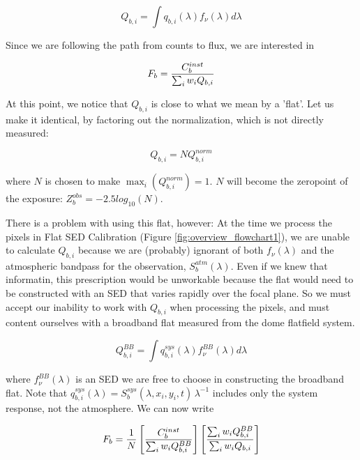 \documentclass[12pt,preprint]{aastex}
\begin{document}
\begin{equation}
Q_{b,i} = \int {q_{b,i}(\lambda) f_\nu(\lambda) d\lambda}
\end{equation}

Since we are following the path from counts to flux, we are interested in

\begin{equation}
F_b = {C_b^{inst} \over {\sum_i{w_i Q_{b,i}}}}
\label{eqn:trueFlat}
\end{equation}

At this point, we notice that $Q_{b,i}$ is close to what we mean by a 'flat'.  Let us make it identical, by factoring out 
the normalization, which is not directly measured:

\begin{equation}
Q_{b,i} = N Q_{b,i}^{norm}
\end{equation}

where $N$ is chosen to make $\max_i(Q_{b,i}^{norm}) = 1$.  $N$ will become the zeropoint of the exposure:
$Z_b^{obs} = -2.5 log_{10}(N)$.

There is a problem with using this flat, however:  At the time we process the pixels
in Flat SED Calibration (Figure \ref{fig:overview_flowchart1}), we are unable to calculate $Q_{b,i}$ because we are (probably) ignorant
of both $f_\nu(\lambda)$ and the atmospheric bandpass for the observation, $S_b^{atm}(\lambda)$.  Even if we knew that informatin, 
this prescription would be unworkable because the flat would need to be constructed with an SED 
that varies rapidly over the focal plane.   So we must accept our inability to work with $Q_{b,i}$ when processing the pixels, and must
content ourselves with a broadband flat measured from the dome flatfield system.

\begin{equation}
Q_{b,i}^{BB} = \int {q_{b,i}^{sys}(\lambda) f_\nu^{BB}(\lambda) d\lambda}
\end{equation}

where $f_\nu^{BB}(\lambda)$ is an SED we are free to choose in constructing the broadband flat. Note that 
$q_{b,i}^{sys}(\lambda)=S_b^{sys}(\lambda,x_i,y_i,t) \, \lambda^{-1}$ 
includes only the system response, not the atmosphere.  We can now write

\begin{equation}
F_b = {1 \over N} \left[ {C_b^{inst} \over {\sum_i{w_i Q_{b,i}^{BB}}}}\right]  \left[ {\sum_i {w_i Q_{b,i}^{BB} }} \over {\sum_i {w_i Q_{b,i} }}\right]
\end{equation}
\end{document}
